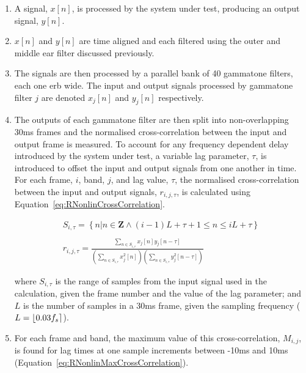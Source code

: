 			\begin{enumerate}
				\item A signal, $x[n]$, is processed by the system under test, producing an output signal,
					$y[n]$.

				\item $x[n]$ and $y[n]$ are time aligned and each filtered using the outer and middle ear
					filter discussed previously.

				\item The signals are then processed by a parallel bank of 40 gammatone filters, each one
					\acrshort{erb} wide. The input and output signals processed by gammatone filter $j$
					are denoted $x_j[n]$ and $y_j[n]$ respectively.

				\item The outputs of each gammatone filter are then split into non-overlapping 30ms frames
					and the normalised cross-correlation between the input and output frame is
					measured.  To account for any frequency dependent delay introduced by the system
					under test, a variable lag parameter, $\tau$, is introduced to offset the input and
					output signals from one another in time. For each frame, $i$, band, $j$, and lag
					value, $\tau$, the normalised cross-correlation between the input and output
					signals, $r_{i,j,\tau}$, is calculated using
					Equation~\ref{eq:RNonlinCrossCorrelation}.

					\begin{gather}
						S_{i,\tau} = \left\{ n | n \in \textbf{Z} 
							   \land (i-1)L+\tau+1 \leq n \leq iL + \tau \right\} \nonumber \\
						\nonumber \\
						r_{i,j,\tau} = \frac{\sum_{n \in S_{i,\tau}} x_{j}[n]y_{j}[n-\tau]}
							{\left( \sum_{n \in S_{i,\tau}} x_{j}^{2}[n] \right) 
							\left( \sum_{n \in S_{i,\tau}} y_{j}^{2}[n-\tau] \right)}
						\label{eq:RNonlinCrossCorrelation}
					\end{gather}

					where $S_{i,\tau}$ is the range of samples from the input signal used in the
					calculation, given the frame number and the value of the lag parameter; and $L$ is
					the number of samples in a 30ms frame, given the sampling frequency ($L =
					\left\lfloor0.03f_{s}\right\rceil$). 

				\item For each frame and band, the maximum value of this cross-correlation, $M_{i,j}$, is
					found for lag times at one sample increments between -10ms and 10ms
					(Equation~\ref{eq:RNonlinMaxCrossCorrelation}).


\end{enumerate}
